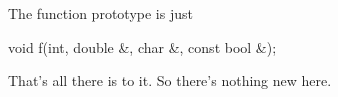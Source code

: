 The function prototype is just

\begin{consolethree}[escapeinside=||]
void f(int, double &, char &, const bool &);
\end{consolethree}

That's all there is to it. So there's nothing new here.






